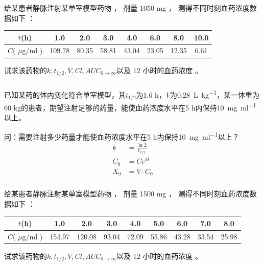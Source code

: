 \documentclass[dvipsnames, svgnames, x11names]{beamer}
\begin{document}
\begin{frame}[t]
    \frametitle{}
    \begin{example}
        给某患者静脉注射某单室模型药物 ， 剂量 1050 mg ， 测得不同时刻血药浓度数据如下 ：
        \begin{table}
            \centering
            \begin{tabular}{cccccccc}
               \toprule
                $t$(h) & 1.0 & 2.0 & 3.0 & 4.0 & 6.0 & 8.0 & 10.0 \\ \hline
                $C$( $\mu$g/ml ) & 109.78 & 80.35 & 58.81 & 43.04 & 23.05 & 12.35 & 6.61 \\ \bottomrule
            \end{tabular}
        \end{table}
        试求该药物的$k,t_{1/2},V,Cl,{AUC}_{0\to\infty}$以及 12 小时的血药浓度 。
    \end{example}
\end{frame}


\begin{frame}[t]
    \frametitle{}
    \begin{question}
        已知某药的体内变化符合单室模型，其$t_{1/2}$为1.6 h，$V$为\SI{0.28}{L.kg^{-1}}，某一体重为60 kg的患者，期望注射足够的药量，能使血药浓度水平在5 h内保持\SI{10}{mg.ml^{-1}}以上。
    
        问：需要注射多少药量才能使血药浓度水平在5 h内保持\SI{10}{mg.ml^{-1}}以上？
        \tcblower
        \pause
        \[
            \begin{aligned}
                k &=\frac{\ln2}{t_{1/2}} \\
                C_0 &= Ce^{kt} \\
                X_0 &= V\cdot C_0
            \end{aligned}
        \]
    \end{question}
\end{frame}


\begin{frame}[t]
    \frametitle{}
    \begin{question}
        给某患者静脉注射某单室模型药物 ， 剂量 1500 mg ， 测得不同时刻血药浓度数据如下 ：
        \begin{table}
            \centering
            \begin{tabular}{ccccccccc}
               \toprule
                $t$(h) & 1.0 & 2.0 & 3.0 & 4.0 & 5.0 & 6.0 & 7.0 & 8.0 \\ \hline
                $C$( $\mu$g/ml ) & 154.97 & 120.08 & 93.04 & 72.09 & 55.86 & 43.28 & 33.54 & 25.98 \\ \bottomrule
            \end{tabular}
        \end{table}
        试求该药物的$k,t_{1/2},V,Cl,{AUC}_{0\to\infty}$以及 12 小时的血药浓度 。
    \end{question}
\end{frame}
\end{document}
